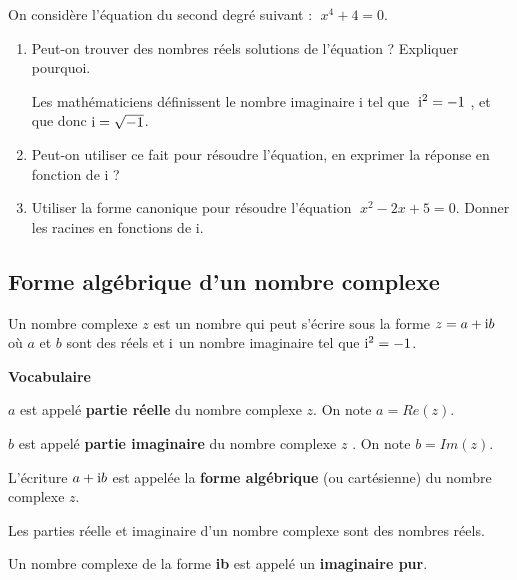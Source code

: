 \begin{lemma}
On considère l'équation du second degré suivant : $\; x^4+4=0 $.
\begin{enumerate}
\item Peut-on trouver  des nombres réels solutions de l'équation ? Expliquer pourquoi.

\medskip

Les mathématiciens définissent  le nombre imaginaire i tel que  $ \;\text{i}^2=-1 $ , et que donc $ \text{i}=\sqrt{-1} $.

\item Peut-on utiliser ce fait pour résoudre l'équation, en exprimer la réponse en fonction de i ?
\item Utiliser la forme canonique pour résoudre l'équation  $\; x^2-2x+5=0 $. Donner les racines en fonctions de i.
\end{enumerate}
\end{lemma}
 \subsection{Forme algébrique d'un nombre complexe}
 \begin{definition}
Un nombre complexe $ z $ est un nombre qui peut s'écrire  sous la forme $ z=a+\text{i} b $  où $a $ et $ b$  sont des réels et $ \text{i} $ un nombre imaginaire tel que $ \text{i}^2=-1 $.
 
 \end{definition}

\medskip
\textbf{Vocabulaire}

\medskip

$ a $ est appelé \textbf{partie réelle} du nombre complexe $ z $. On note $ a = Re(z)$. 
\medskip

$ b $  est appelé \textbf{partie imaginaire} du nombre complexe $ z$ . On note $ b = Im(z)$.

\medskip
L'écriture $ a+ \text{i} b$  est appelée  la \textbf{forme algébrique}  (ou cartésienne) du nombre complexe $ z $.

\medskip
\begin{remark}
 Les parties réelle et imaginaire d'un nombre complexe sont des nombres réels.
 \end{remark}
 \medskip
 
 Un nombre complexe de la forme \textbf{ib} est appelé un \textbf{imaginaire pur}.
 
